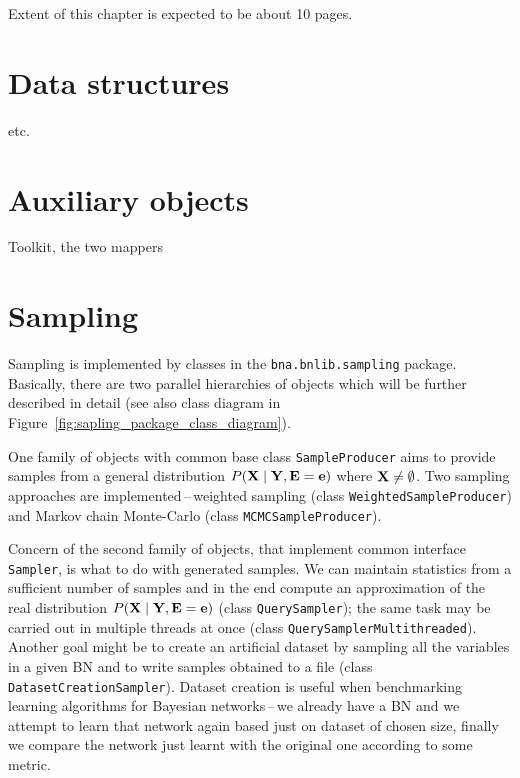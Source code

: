 \documentclass[english,cover]{fitthesis} %
\newcommand{\srccode}[1]{{\tt #1}}         %
\newcommand{\vars}[1]{{\bold{#1}}}         %
\newcommand{\todo}[1]{{\color{red}#1}}
\begin{document}
\todo{Extent of this chapter is expected to be about 10 pages.}



\section{Data structures}
\todo{\srccode{Variable, Factor, Node, BayesianNetwork} etc.}








\section{Auxiliary objects}
\todo{Toolkit, the two mappers}







\section{Sampling}
Sampling is implemented by classes in the \srccode{bna.bnlib.sampling} package. Basically, there are two parallel hierarchies of objects which will be further described in detail \todo{(see also class diagram in Figure~\ref{fig:sapling_package_class_diagram})}.

One family of objects with common base class \srccode{SampleProducer} aims to provide samples from a general distribution $P(\vars{X} \mid \vars{Y}, \vars{E} = \vars{e})$ where $\vars{X} \neq \emptyset$. Two sampling approaches are implemented\,--\,weighted sampling (class \srccode{WeightedSampleProducer}) and Markov chain Monte-Carlo (class \srccode{MCMCSampleProducer}).

Concern of the second family of objects, that implement common interface \srccode{Sampler}, is what to do with generated samples. We can maintain statistics from a sufficient number of samples and in the end compute an approximation of the real distribution $P(\vars{X} \mid \vars{Y}, \vars{E} = \vars{e})$ (class \srccode{QuerySampler}); the same task may be carried out in multiple threads at once (class \srccode{QuerySamplerMultithreaded}). Another goal might be to create an artificial dataset by sampling all the variables in a given BN and to write samples obtained to a file (class \srccode{DatasetCreationSampler}). Dataset creation is useful when benchmarking learning algorithms for Bayesian networks\,--\,we already have a BN and we attempt to learn that network again based just on dataset of chosen size, finally we compare the network just learnt with the original one according to some metric.
\end{document}
